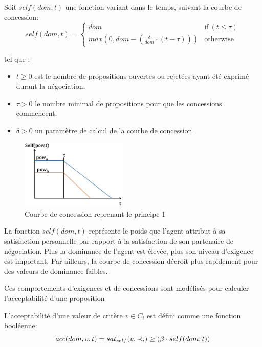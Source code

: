 	Soit $ self (dom, t) $ une fonction variant dans le temps, suivant la courbe de concession:
	\begin{equation}
	self(dom, t) = \left\{\begin{array}{ll}
	dom & \mathrm{if\ } (t \leq \tau)\\
	max(0, dom - (\frac{\delta}{dom} \cdot (t - \tau))) & \mathrm{otherwise}
	\end{array}\right.
	\end{equation}
	
	
	
	tel que :
	\begin{itemize}
		\item $t \geq 0$ est le nombre de propositions ouvertes ou rejetées ayant été exprimé durant la négociation.
		\item $\tau > 0$ le nombre minimal de propositions pour que les concessions commencent.
		\item  $\delta > 0$ un paramètre de calcul de la courbe de concession.
		
	\end{itemize}  
			

	
		\begin{figure}[h]
			\includegraphics[width=2in]{Figures/chap4/self.png}
			\caption{\label{fig:conc}Courbe de concession reprenant le principe 1}
		\end{figure} 
		
		La fonction $self(dom,t)$ représente le poids que l'agent attribut à sa satisfaction personnelle par rapport à la satisfaction de son partenaire de négociation. Plus la dominance de l'agent est élevée, plus son niveau d'exigence est important. Par ailleurs, la courbe de concession décroît plus rapidement pour des valeurs de dominance faibles.
		
		
	Ces comportements d'exigences et de concessions sont modélisés pour calculer l'acceptabilité d'une proposition 
	
	L'acceptabilité d'une valeur de critère $v \in C_i$ est défini comme une fonction booléenne:
	\begin{equation}
	\vspace{0.5em}
	acc(dom,v, t) = sat_{self}(v, \prec_i) \geq  (\beta \cdot self(dom,t))
	\end{equation}
	
